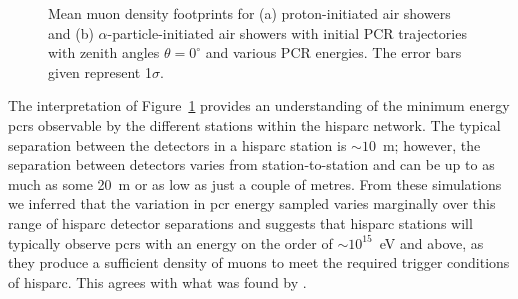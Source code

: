 \begin{figure}[ht!]
	\centering
	\qquad
	\caption{Mean muon density footprints for (a) proton-initiated air showers and (b) $\alpha$-particle-initiated air showers with initial PCR trajectories with zenith angles $\theta=0^{\circ}$ and various PCR energies. The error bars given represent 1$\sigma$.} \label{fig:shower_footprints}
\end{figure}

The interpretation of Figure~\ref{fig:shower_footprints} provides an understanding of the minimum energy \glspl{pcr} observable by the different stations within the \gls{hisparc} network. The typical separation between the detectors in a \gls{hisparc} station is $\sim 10$~m; however, the separation between detectors varies from station-to-station and can be up to as much as some 20~m or as low as just a couple of metres. From these simulations we inferred that the variation in \gls{pcr} energy sampled varies marginally over this range of \gls{hisparc} detector separations and suggests that \gls{hisparc} stations will typically observe \glspl{pcr} with an energy on the order of $\sim 10^{15}$~eV and above, as they produce a sufficient density of muons to meet the required trigger conditions of \gls{hisparc}. This agrees with what was found by \cite{van_dam_hisparc_2020}.

